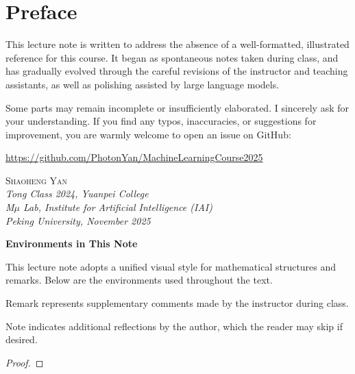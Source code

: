 \documentclass[../main]{subfiles}
\begin{document}
\chapter*{Preface}
This lecture note is written to address the absence of a well-formatted, illustrated reference for this course.  
It began as spontaneous notes taken during class, and has gradually evolved through the careful revisions of the instructor and teaching assistants, as well as polishing assisted by large language models.

Some parts may remain incomplete or insufficiently elaborated. I sincerely ask for your understanding.  
If you find any typos, inaccuracies, or suggestions for improvement, you are warmly welcome to open an issue on GitHub:

\begin{center}
\url{https://github.com/PhotonYan/MachineLearningCourse2025}
\end{center}

\begin{flushright}
    \textsc{Shaoheng Yan} \\[3pt]
    \scriptsize\textit{Tong Class 2024, Yuanpei College} \\
    \textit{M$\mu$ Lab, Institute for Artificial Intelligence (IAI)} \\[3pt]
    \textit{Peking University, November 2025}
\end{flushright}
\begin{center}
    { \large \textbf{Environments in This Note}}
\end{center}


This lecture note adopts a unified visual style for mathematical structures and remarks.  
Below are the environments used throughout the text.

\begin{definition}
\end{definition}

\begin{theorem}
\end{theorem}

\begin{proposition}
\end{proposition}

\begin{remark}
    Remark represents supplementary comments made by the instructor during class.
\end{remark}

\begin{note}
    Note indicates additional reflections by the author, which the reader may skip if desired.
\end{note}

\begin{example}
\end{example}


\begin{proof}
\end{proof}
\begin{solution}
    
\end{solution}
\end{document}
